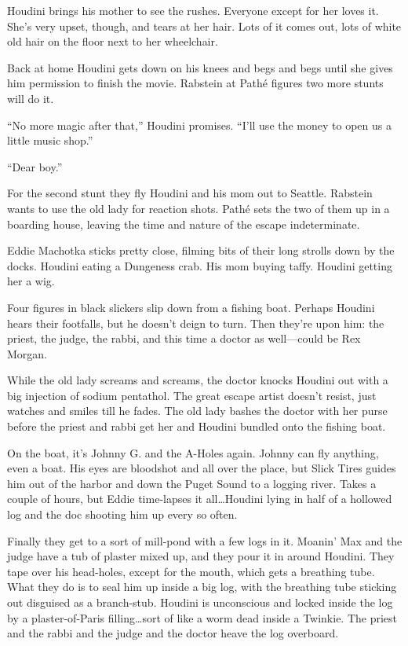 Houdini brings his mother to see the rushes. Everyone except for her loves it. She's very upset, though, and tears at her hair. Lots of it comes out, lots of white old hair on the floor next to her wheelchair.

Back at home Houdini gets down on his knees and begs and begs until she gives him permission to finish the movie. Rabstein at Pathé figures two more stunts will do it.

``No more magic after that,'' Houdini promises. ``I'll use the money to open us a little music shop.''

``Dear boy.''

For the second stunt they fly Houdini and his mom out to Seattle. Rabstein wants to use the old lady for reaction shots. Pathé sets the two of them up in a boarding house, leaving the time and nature of the escape indeterminate.

Eddie Machotka sticks pretty close, filming bits of their long strolls down by the docks. Houdini eating a Dungeness crab. His mom buying taffy. Houdini getting her a wig.

Four figures in black slickers slip down from a fishing boat. Perhaps Houdini hears their footfalls, but he doesn't deign to turn. Then they're upon him: the priest, the judge, the rabbi, and this time a doctor as well—could be Rex Morgan.

While the old lady screams and screams, the doctor knocks Houdini out with a big injection of sodium pentathol. The great escape artist doesn't resist, just watches and smiles till he fades. The old lady bashes the doctor with her purse before the priest and rabbi get her and Houdini bundled onto the fishing boat.

On the boat, it's Johnny G. and the A-Holes again. Johnny can fly anything, even a boat. His eyes are bloodshot and all over the place, but Slick Tires guides him out of the harbor and down the Puget Sound to a logging river. Takes a couple of hours, but Eddie time-lapses it all\ldots Houdini lying in half of a hollowed log and the doc shooting him up every so often.

Finally they get to a sort of mill-pond with a few logs in it. Moanin' Max and the judge have a tub of plaster mixed up, and they pour it in around Houdini. They tape over his head-holes, except for the mouth, which gets a breathing tube. What they do is to seal him up inside a big log, with the breathing tube sticking out disguised as a branch-stub. Houdini is unconscious and locked inside the log by a plaster-of-Paris filling\ldots sort of like a worm dead inside a Twinkie. The priest and the rabbi and the judge and the doctor heave the log overboard.

